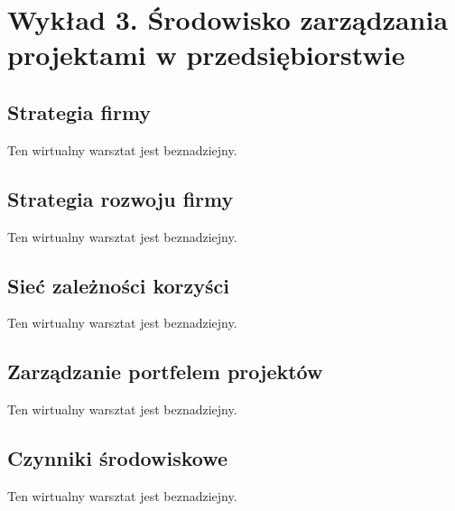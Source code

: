 \chapter{Wykład 3. Środowisko zarządzania projektami w przedsiębiorstwie}

\section{Strategia firmy}

Ten wirtualny warsztat jest beznadziejny.


\section{Strategia rozwoju firmy}

Ten wirtualny warsztat jest beznadziejny.


\section{Sieć zależności korzyści}

Ten wirtualny warsztat jest beznadziejny.


\section{Zarządzanie portfelem projektów}

Ten wirtualny warsztat jest beznadziejny.


\section{Czynniki środowiskowe}

Ten wirtualny warsztat jest beznadziejny.


